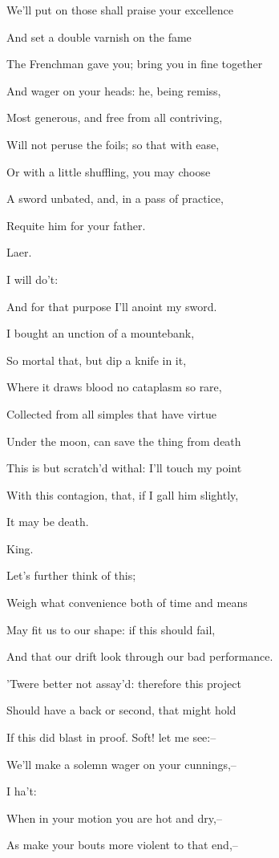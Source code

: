 \documentclass[12pt]{book}
\begin{document}
We'll put on those shall praise your excellence

And set a double varnish on the fame

The Frenchman gave you; bring you in fine together

And wager on your heads: he, being remiss,

Most generous, and free from all contriving,

Will not peruse the foils; so that with ease,

Or with a little shuffling, you may choose

A sword unbated, and, in a pass of practice,

Requite him for your father.



Laer.

I will do't:

And for that purpose I'll anoint my sword.

I bought an unction of a mountebank,

So mortal that, but dip a knife in it,

Where it draws blood no cataplasm so rare,

Collected from all simples that have virtue

Under the moon, can save the thing from death

This is but scratch'd withal: I'll touch my point

With this contagion, that, if I gall him slightly,

It may be death.



King.

Let's further think of this;

Weigh what convenience both of time and means

May fit us to our shape: if this should fail,

And that our drift look through our bad performance.

'Twere better not assay'd: therefore this project

Should have a back or second, that might hold

If this did blast in proof. Soft! let me see:--

We'll make a solemn wager on your cunnings,--

I ha't:

When in your motion you are hot and dry,--

As make your bouts more violent to that end,--
\end{document}
